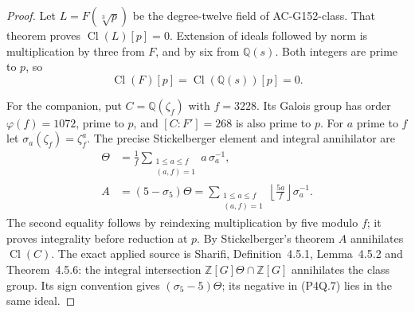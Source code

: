 \begin{proof}
Let $L=F(\sqrt[3]p)$ be the degree-twelve field of AC-G152-class.
That theorem proves $\operatorname{Cl}(L)[p]=0$.
Extension of ideals followed by norm is multiplication by three
from $F$, and by six from $\mathbb Q(s)$.
Both integers are prime to $p$, so
\[
              \operatorname{Cl}(F)[p]=
              \operatorname{Cl}(\mathbb Q(s))[p]=0.
 \tag{P4Q.6}
\]

For the companion, put $C=\mathbb Q(\zeta_f)$ with $f=3228$.
Its Galois group has order $\varphi(f)=1072$, prime to $p$,
and $[C:F']=268$ is also prime to $p$.
For $a$ prime to $f$ let $\sigma_a(\zeta_f)=\zeta_f^a$.
The precise Stickelberger element and integral annihilator are
\[
 \begin{aligned}
 \Theta&=\frac1f\sum_{\substack{1\leq a\leq f\\(a,f)=1}}
                                a\,\sigma_a^{-1},\\
 A&=(5-\sigma_5)\Theta
   =\sum_{\substack{1\leq a\leq f\\(a,f)=1}}
                     \left\lfloor\frac{5a}{f}\right\rfloor\sigma_a^{-1}.
 \end{aligned}
 \tag{P4Q.7}
\]
The second equality follows by reindexing multiplication by five
modulo $f$; it proves integrality before reduction at $p$.
By Stickelberger's theorem $A$ annihilates $\operatorname{Cl}(C)$.
The exact applied source is Sharifi, Definition~4.5.1,
Lemma~4.5.2 and Theorem~4.5.6: the integral intersection
$\mathbb Z[G]\Theta\cap\mathbb Z[G]$ annihilates the class group.
Its sign convention gives $(\sigma_5-5)\Theta$; its negative
in (P4Q.7) lies in the same ideal.


\end{proof}
